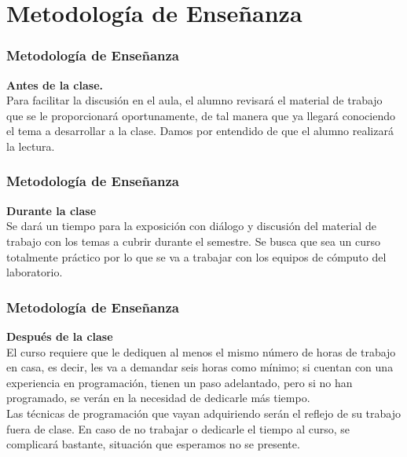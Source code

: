 \documentclass[12pt]{beamer}
\begin{document}
\section{Metodología de Enseñanza}
\begin{frame}
\frametitle{Metodología de Enseñanza}
\textbf{Antes de la clase.}
\\
\medskip
Para facilitar la discusión en el aula, el alumno revisará el material de trabajo que se le proporcionará oportunamente, de tal manera que ya llegará conociendo el tema a desarrollar a la clase. Damos por entendido de que el alumno realizará la lectura.
\end{frame}
\begin{frame}
\frametitle{Metodología de Enseñanza}
\textbf{Durante la clase}
\\
\medskip
Se dará un tiempo para la exposición con diálogo y discusión del material de trabajo con los temas a cubrir durante el semestre. Se busca que sea un curso totalmente práctico por lo que se va a trabajar con los equipos de cómputo del laboratorio.
\end{frame}
\begin{frame}
\frametitle{Metodología de Enseñanza}
\textbf{Después de la clase}
\\
\medskip
El curso requiere que le dediquen al menos el mismo n\'{u}mero de horas de trabajo en casa, es decir, les va a demandar seis horas como mínimo; si cuentan con una experiencia en programación, tienen un paso adelantado, pero si no han programado, se verán en la necesidad de dedicarle más tiempo.
\\
\medskip
Las técnicas de programación que vayan adquiriendo serán el reflejo de su trabajo fuera de clase. En caso de no trabajar o dedicarle el tiempo al curso, se complicará bastante, situación que esperamos no se presente.
\end{frame}
\end{document}
